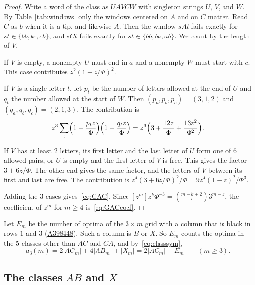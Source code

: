 \documentclass[12pt]{article}
\theoremstyle{plain}
\theoremstyle{definition}
\theoremstyle{remark}
\newcommand{\seqnum}[1]{\href{https://oeis.org/#1}{\rm \underline{#1}}}
\begin{document}
\begin{proof}
Write a word of the class as $UAVCW$ with singleton strings $U$, $V$, and $W$.
By Table~\ref{tab:windows} only the windows centered on $A$ and on $C$ matter.
Read $C$ as $b$ when it is a tip, and likewise $A$. Then the window $sAt$ fails
exactly for $st\in\{bb,bc,cb\}$, and $sCt$ fails exactly for
$st\in\{bb,ba,ab\}$. We count by the length of $V$.

If $V$ is empty, a nonempty $U$ must end in $a$ and a nonempty $W$ must start
with $c$. This case contributes $z^2(1+z/\Phi)^2$.

If $V$ is a single letter $t$, let $p_t$ be the number of letters allowed at the
end of $U$ and $q_t$ the number allowed at the start of $W$. Then
$(p_a,p_b,p_c)=(3,1,2)$ and $(q_a,q_b,q_c)=(2,1,3)$. The contribution is
\[
z^3\sum_t\Bigl(1+\frac{p_tz}{\Phi}\Bigr)\Bigl(1+\frac{q_tz}{\Phi}\Bigr)
=z^3\Bigl(3+\frac{12z}{\Phi}+\frac{13z^2}{\Phi^2}\Bigr).
\]

If $V$ has at least $2$ letters, its first letter and the last letter of $U$
form one of $6$ allowed pairs, or $U$ is empty and the first letter of $V$ is
free. This gives the factor $3+6z/\Phi$. The other end gives the same factor,
and the letters of $V$ between its first and last are free. The contribution
is $z^4(3+6z/\Phi)^2/\Phi=9z^4(1-z)^2/\Phi^3$.

Adding the $3$ cases gives~\eqref{eq:GAC}. Since
$[z^m]z^k\Phi^{-3}=\binom{m-k+2}23^{m-k}$, the coefficient of $z^m$ for $m\ge4$
is~\eqref{eq:GACcoef}.
\end{proof}

Let $E_m$ be the number of optima of the $3\times m$ grid with a column that is
black in rows $1$ and $3$ (\seqnum{A398448}). Such a column is $B$ or $X$. So
$E_m$ counts the optima in the $5$ classes other than $AC$ and $CA$, and
by~\eqref{eq:classsym},
\begin{equation}\label{eq:classsum}
a_3(m)=2|AC_m|+4|AB_m|+|X_m|=2|AC_m|+E_m\qquad(m\ge3).
\end{equation}

\subsection{\texorpdfstring{The classes $AB$ and $X$}{The classes AB and X}}\label{sec:threeruns}
\end{document}
